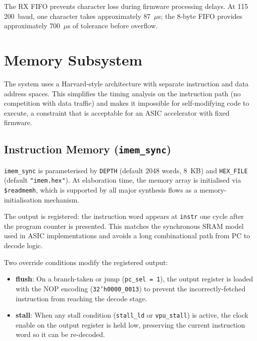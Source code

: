 The RX FIFO prevents character loss during firmware processing delays. At 115\,200~baud,
one character takes approximately 87~$\mu$s; the 8-byte FIFO provides approximately
700~$\mu$s of tolerance before overflow.

\section{Memory Subsystem}
\label{sec:memory}

The system uses a Harvard-style architecture with separate instruction and data address
spaces. This simplifies the timing analysis on the instruction path (no competition
with data traffic) and makes it impossible for self-modifying code to execute, a
constraint that is acceptable for an ASIC accelerator with fixed firmware.

\subsection{Instruction Memory (\texttt{imem\_sync})}
\label{subsec:imem}

\texttt{imem\_sync} is parameterised by \texttt{DEPTH} (default 2048 words, 8~KB) and
\texttt{HEX\_FILE} (default \texttt{"imem.hex"}). At elaboration time, the memory
array is initialised via \texttt{\$readmemh}, which is supported by all major synthesis
flows as a memory-initialisation mechanism.

The output is registered: the instruction word appears at \texttt{instr} one cycle after
the program counter is presented. This matches the synchronous SRAM model used in ASIC
implementations and avoids a long combinational path from PC to decode logic.

Two override conditions modify the registered output:
\begin{itemize}
  \item \textbf{flush}: On a branch-taken or jump (\texttt{pc\_sel = 1}), the output
    register is loaded with the NOP encoding (\texttt{32'h0000\_0013}) to prevent the
    incorrectly-fetched instruction from reaching the decode stage.
  \item \textbf{stall}: When any stall condition (\texttt{stall\_ld} or \texttt{vpu\_stall})
    is active, the clock enable on the output register is held low, preserving the
    current instruction word so it can be re-decoded.
\end{itemize}

